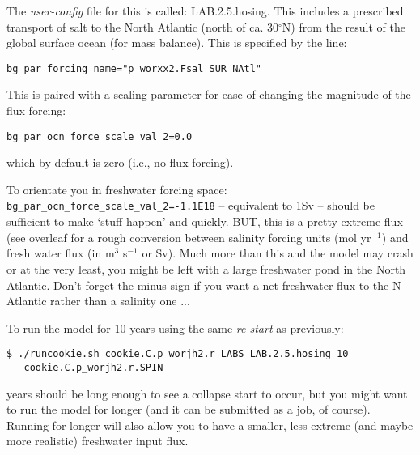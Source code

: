 The \textit{user-config} file for this is called: \textsf{\footnotesize LAB.2.5.hosing}. This includes a prescribed transport of salt to the North Atlantic (north of ca. 30$^{\circ}$N) from the result of the global surface ocean (for mass balance). This is specified by the line:

\vspace{-2mm}\small\begin{verbatim}
bg_par_forcing_name="p_worxx2.Fsal_SUR_NAtl"
\end{verbatim}\normalsize\vspace{-2mm}

This is paired with a scaling parameter for ease of changing the magnitude of the flux forcing:

\vspace{-2mm}\small\begin{verbatim}
bg_par_ocn_force_scale_val_2=0.0
\end{verbatim}\normalsize\vspace{-2mm}

\noindent which by default is zero (i.e., no flux forcing).

\vspace{1mm}
To orientate you in freshwater forcing space: \texttt{bg\_par\_ocn\_force\_scale\_val\_2=-1.1E18} -- equivalent to 1Sv -- should be sufficient to make ‘stuff happen’ and quickly. BUT, this is a pretty extreme flux (see overleaf for a rough conversion between salinity forcing units (mol yr$^{-1}$) and fresh water flux (in m$^{3}$ s$^{-1}$ or Sv). Much more than this and the model may crash or at the very least, you might be left with a large freshwater pond in the North Atlantic. Don't forget the minus sign if you want a net freshwater flux to the N Atlantic rather than a salinity one ...

\vspace{1mm}
To run the model for 10 years using the same \textit{re-start} as previously:

\vspace{-2mm}\small\begin{verbatim}
$ ./runcookie.sh cookie.C.p_worjh2.r LABS LAB.2.5.hosing 10 
   cookie.C.p_worjh2.r.SPIN
\end{verbatim}\normalsize\vspace{-2mm}

 years should be long enough to see a collapse start to occur, but you might want to run the model for longer (and it can be submitted as a job, of course). Running for longer will also allow you to have a smaller, less extreme (and maybe more realistic) freshwater input flux.

